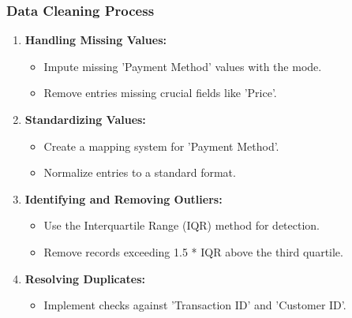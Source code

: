 \documentclass[aspectratio=169]{beamer}
\begin{document}
\begin{frame}[fragile]
    \frametitle{Data Cleaning Process}
    
    \begin{enumerate}
        \item \textbf{Handling Missing Values:}
        \begin{itemize}
            \item Impute missing 'Payment Method' values with the mode.
            \item Remove entries missing crucial fields like 'Price'.
        \end{itemize}
        
        \item \textbf{Standardizing Values:}
        \begin{itemize}
            \item Create a mapping system for 'Payment Method'.
            \item Normalize entries to a standard format.
        \end{itemize}
        
        \item \textbf{Identifying and Removing Outliers:}
        \begin{itemize}
            \item Use the Interquartile Range (IQR) method for detection.
            \item Remove records exceeding 1.5 * IQR above the third quartile.
        \end{itemize}
        
        \item \textbf{Resolving Duplicates:}
        \begin{itemize}
            \item Implement checks against 'Transaction ID' and 'Customer ID'.
        \end{itemize}
    \end{enumerate}
\end{frame}
\end{document}
